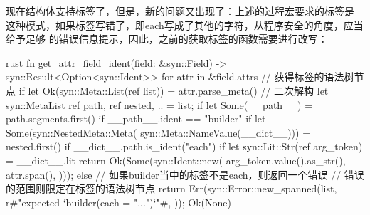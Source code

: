 现在结构体支持标签了，但是，新的问题又出现了：上述的过程宏要求的标签是
这种模式，如果标签写错了，即each写成了其他的字符，从程序安全的角度，应当给予足够
的错误信息提示，因此，之前的获取标签的函数需要进行改写：
\begin{code-block}{rust}
fn get_attr_field_ident(field: &syn::Field) -> syn::Result<Option<syn::Ident>> {
    for attr in &field.attrs {
        // 获得标签的语法树节点
        if let Ok(syn::Meta::List(ref list)) = attr.parse_meta() {
            // 二次解构
            let syn::MetaList { ref path, ref nested, ..  } = list;
            if let Some(__path__) = path.segments.first() {
                if __path__.ident == "builder" {
                    if let Some(syn::NestedMeta::Meta(
                        syn::Meta::NameValue(__dict__))) = nested.first()
                    {
                        if __dict__.path.is_ident("each") {
                            if let syn::Lit::Str(ref arg_token) = __dict__.lit {
                                return Ok(Some(syn::Ident::new(
                                    arg_token.value().as_str(),
                                    attr.span(),
                                )));
                            }
                        } else {
                            // 如果builder当中的标签不是each，则返回一个错误
                            // 错误的范围则限定在标签的语法树节点
                            return Err(syn::Error::new_spanned(list,
                                r#"expected `builder(each = "...")`"#,
                            ));
                        }
                    }
                }
            }
        }
    }
    Ok(None)
}
\end{code-block}

